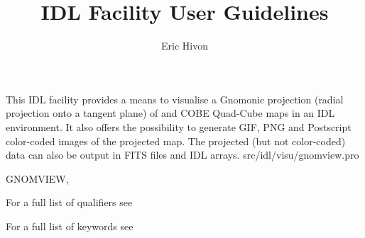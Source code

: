 




\sloppy



\title{\healpix IDL Facility User Guidelines}
 \section[gnomview]{ }
\label{idl:\thedocid}
\author{Eric Hivon}



\begin{facility}
{This IDL facility provides a means to visualise a Gnomonic projection 
(radial projection onto a tangent plane) of
\healpix and COBE Quad-Cube maps in an IDL environment. 
It also offers the possibility to
generate GIF, PNG and Postscript color-coded images of the projected map.
The projected (but not color-coded) data can also be output in FITS files and
IDL arrays.}
{src/idl/visu/gnomview.pro}
\end{facility}

\begin{IDLformat}
{GNOMVIEW, 
\normalsize{
}
}
\end{IDLformat}

\begin{qualifiers}
  \begin{qulist}{} %
\item [{\  }] For a full list of qualifiers see 
  \end{qulist}
\end{qualifiers}

\begin{keywords}
  \begin{kwlist}{} %
\item [{\  }] For a full list of keywords see 
  \end{kwlist}
\end{keywords}


